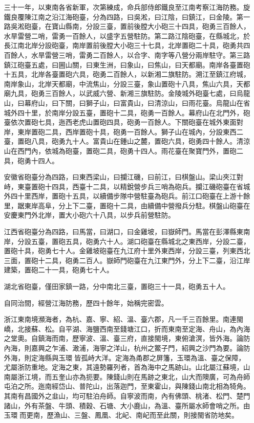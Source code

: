 \begin{pinyinscope}
三十一年，以東南各省新軍，次第練成，命兵部侍郎鐵良至江南考察江海防務。旋鐵良覆陳江南之沿江海砲臺，分為四路，曰吳淞，曰江陰，曰鎮江，曰金陵。第一路吳淞砲臺，在寶山縣南，分設三臺，置前後膛大小砲三十四具，砲勇三百餘人，水旱雷營二哨，雷勇一百餘人，以盛字五營駐防。第二路江陰砲臺，在縣城北，於長江南北岸分設砲臺，南岸置前後膛大小砲三十七具，北岸置砲二十具，砲勇共四百餘人，水旱雷營三哨，雷勇二百餘人，以合字、南字等八營分兩岸駐守。第三路鎮江砲臺五處，曰圌山關，曰東生洲，曰象山，曰焦山，曰天都廟。南岸各臺置砲十五具，北岸各臺置砲六具，砲勇二百餘人，以新湘二旗駐防。溯江至鎮江府城，南岸象山，北岸天都廟，中流焦山，分設三臺，象山置砲十八具，焦山六具，天都廟九具，砲勇三百餘人，以武威六營、新湘三旗駐防。金陵城外砲臺七處，曰烏龍山，曰幕府山，曰下關，曰獅子山，曰富貴山，曰清涼山，曰雨花臺。烏龍山在省城外四十里，於南岸分設五臺，置砲十二具，砲勇一百餘人。幕府山在北門外，砲臺依次置砲七具，迤西老虎山置砲四具，砲勇一百餘人。下關砲臺在城外東面對岸，東岸置砲二具，西岸置砲十具，砲勇一百餘人。獅子山在城內，分設東西二臺，置砲八具，砲勇九十人。富貴山在鍾山之麓，置砲六具，砲勇四十餘人。清涼山在西門內，依城為砲臺，置砲二具，砲勇十四人。雨花臺在聚寶門外，置砲二具，砲勇十四人。

安徽省砲臺分為四路，曰東西梁山，曰攔江磯，曰前江，曰棋盤山。梁山夾江對峙，東臺置砲十四具，西臺十二具，以精銳營步兵三哨為砲兵。攔江磯砲臺在省城外四十里西岸，置砲十五具，以續備步隊中營駐臺為砲兵。前江口砲臺在上游十餘里，踞東岸高阜，分上下二臺，置砲十二具，由續備中營撥兵分駐。棋盤山砲臺在安慶東門外北岸，置大小砲六十八具，以步兵前營駐防。

江西省砲臺分為四路，曰馬當，曰湖口，曰金雞坡，曰嶽師門。馬當在彭澤縣東南岸，分設五臺，置砲五具，砲勇六十人。湖口砲臺在縣城北之東西岸，分設二臺，置砲十具，砲勇七十人。金雞坡砲臺在九江府十里外東西岸，分設三臺，列東西北三面，置砲十二具，砲勇二百人。嶽師門砲臺在九江東門外，分上下二臺，沿江岸建築，置砲二十一具，砲勇七十人。

湖北省砲臺，僅田家鎮一路，分中南北三臺，置砲三十一具，砲勇五十人。

自同治間，經營江海防務，歷四十餘年，始稱完密雲。

浙江東南境瀕海者，為杭、嘉、寧、紹、溫、臺六郡，凡一千三百餘里。南連閩嶠，北接蘇、松。自平湖、海鹽西南至錢塘江口，折而東南至定海、舟山，為內海之堂奧。自鎮海而南，歷寧波、溫、臺三府，直接閩境，東俯滄溟，皆外海。論防內海，則嘉興之乍浦、澉浦，海寧之洋山，杭州之鱉子門，紹興之沙門為要。論防外海，則定海縣與玉環皆孤峙大洋。定海為甬郡之屏籓，玉環為溫、臺之保障，尤屬浙防重地。定海之東，其遠勢羅列者，首為海中之馬跡山。山北屬江蘇境，山南屬浙江境，而五奎山亦為扼要。陳錢山則在馬跡之東北，山大而隩廣，可為舟師屯泊之所。迤南經岱山、普陀山，出落迦門，至東霍山，與陳錢山南北相為犄角。其南有昌國外之韭山，均可駐泊舟師。自寧波而南，內有佛頭、桃渚、松門、楚門諸山，外有茶盤、牛頭、積穀、石塘、大小鹿山，為溫、臺所屬水師會哨之所。由玉環而更南，歷漁山、三盤、鳳凰、北屺、南屺而至此關，則接閩省防地矣。


\end{pinyinscope}
